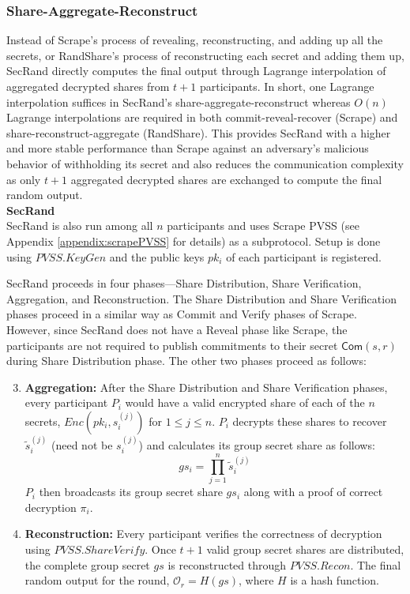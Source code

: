\documentclass[letterpaper,twocolumn,10pt]{article}
\theoremstyle{definition}
\theoremstyle{remark}
\begin{document}
\subsubsection{Share-Aggregate-Reconstruct}
Instead of Scrape's process of revealing, reconstructing, and adding up all the secrets, or RandShare's process of reconstructing each secret and adding them up, SecRand directly computes the final output through Lagrange interpolation of aggregated decrypted shares from $t + 1$ participants. In short, one Lagrange interpolation suffices in SecRand's share-aggregate-reconstruct whereas $O(n)$ Lagrange interpolations are required in both commit-reveal-recover (Scrape) and share-reconstruct-aggregate (RandShare). This provides SecRand with a higher and more stable performance than Scrape against an adversary's malicious behavior of withholding its secret and also reduces the communication complexity as only $t + 1$ aggregated decrypted shares are exchanged to compute the final random output.\\

\textbf{SecRand}\\

SecRand is also run among all $n$ participants and uses Scrape PVSS (see Appendix \ref{appendix:scrapePVSS} for details) as a subprotocol. Setup is done using $PVSS.KeyGen$ and the public keys $pk_i$ of each participant is registered. 

SecRand proceeds in four phases---Share Distribution, Share Verification, Aggregation, and Reconstruction. The Share Distribution and Share Verification phases proceed in a similar way as Commit and Verify phases of Scrape. However, since SecRand does not have a Reveal phase like Scrape, the participants are not required to publish commitments to their secret $\mathsf{Com}(s, r)$ during Share Distribution phase. The other two phases proceed as follows:
\begin{enumerate}
    \setcounter{enumi}{2}
    \item \textbf{Aggregation:} After the Share Distribution and Share Verification phases, every participant $P_i$ would have a valid encrypted share of each of the $n$ secrets, $Enc(pk_i, s_i^{(j)})$ for $1 \le j \le n$. $P_i$ decrypts these shares to recover $\tilde{s}_i^{(j)}$ (need not be $s_i^{(j)}$) and calculates its group secret share as follows: 
    $$ gs_i = \prod_{j=1}^{n}\tilde{s}_i^{(j)} $$
    $P_i$ then broadcasts its group secret share $gs_i$ along with a proof of correct decryption $\pi_i$.
    \item \textbf{Reconstruction:} Every participant verifies the correctness of decryption using $PVSS.ShareVerify$. Once $t+1$ valid group secret shares are distributed, the complete group secret $gs$ is reconstructed through $PVSS.Recon$. The final random output for the round, $\mathcal{O}_r = H(gs)$, where $H$ is a hash function.
\end{enumerate}
\end{document}
